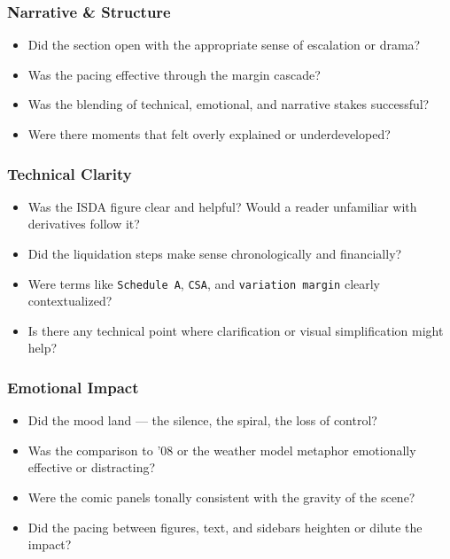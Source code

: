 \subsubsection{Narrative \& Structure}

\begin{itemize}
  \item Did the section open with the appropriate sense of escalation or drama?
  \item Was the pacing effective through the margin cascade?
  \item Was the blending of technical, emotional, and narrative stakes successful?
  \item Were there moments that felt overly explained or underdeveloped?
\end{itemize}

\subsubsection{Technical Clarity}

\begin{itemize}
  \item Was the ISDA figure clear and helpful? Would a reader unfamiliar with derivatives follow it?
  \item Did the liquidation steps make sense chronologically and financially?
  \item Were terms like \texttt{Schedule A}, \texttt{CSA}, and \texttt{variation margin} clearly contextualized?
  \item Is there any technical point where clarification or visual simplification might help?
\end{itemize}

\subsubsection{Emotional Impact}

\begin{itemize}
  \item Did the mood land — the silence, the spiral, the loss of control?
  \item Was the comparison to '08 or the weather model metaphor emotionally effective or distracting?
  \item Were the comic panels tonally consistent with the gravity of the scene?
  \item Did the pacing between figures, text, and sidebars heighten or dilute the impact?
\end{itemize}

